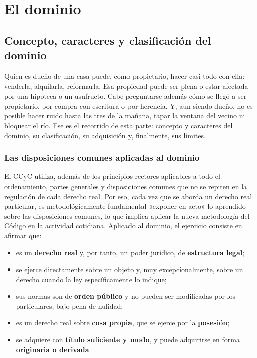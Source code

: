 \documentclass[12pt,oneside]{book}
\begin{document}


\part{El dominio}

\chapter[Concepto, caracteres y clasificación del dominio]{Concepto, caracteres y clasificación del dominio}\label{cap:dominio}

Quien es dueño de una casa puede, como propietario, hacer casi todo con ella: venderla, alquilarla, reformarla. Esa propiedad puede ser plena o estar afectada por una hipoteca o un usufructo. Cabe preguntarse además cómo se llegó a ser propietario, por compra con escritura o por herencia. Y, aun siendo dueño, no es posible hacer ruido hasta las tres de la mañana, tapar la ventana del vecino ni bloquear el río. Ese es el recorrido de esta parte: concepto y caracteres del dominio, su clasificación, su adquisición y, finalmente, sus límites.

\section{Las disposiciones comunes aplicadas al dominio}

El CCyC utiliza, además de los principios rectores aplicables a todo el ordenamiento, partes generales y disposiciones comunes que no se repiten en la regulación de cada derecho real. Por eso, cada vez que se aborda un derecho real particular, es metodológicamente fundamental «exponer en acto» lo aprendido sobre las disposiciones comunes, lo que implica aplicar la nueva metodología del Código en la actividad cotidiana. Aplicado al dominio, el ejercicio consiste en afirmar que:

\begin{itemize}
    \item es un \textbf{derecho real} y, por tanto, un poder jurídico, de \textbf{estructura legal};
    \item se ejerce directamente sobre un objeto y, muy excepcionalmente, sobre un derecho cuando la ley específicamente lo indique;
    \item sus normas son de \textbf{orden público} y no pueden ser modificadas por los particulares, bajo pena de nulidad;
    \item es un derecho real sobre \textbf{cosa propia}, que se ejerce por la \textbf{posesión};
    \item se adquiere con \textbf{título suficiente y modo}, y puede adquirirse en forma \textbf{originaria o derivada}.
\end{itemize}
\end{document}
